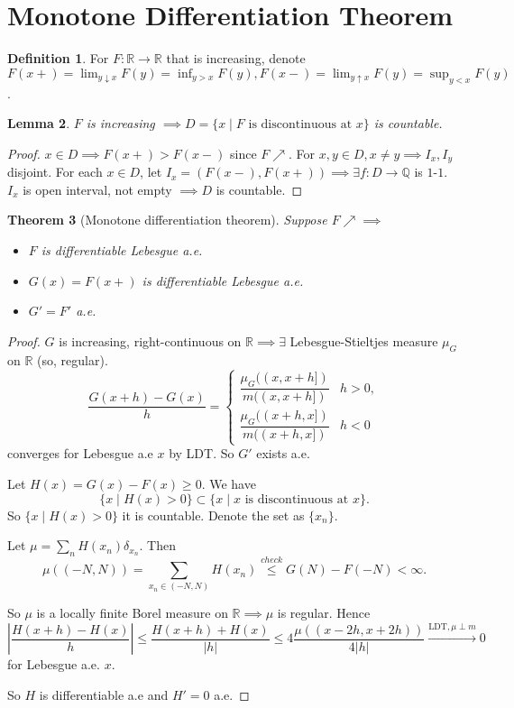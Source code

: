 \documentclass{report}
\newcommand{\R}{\mathbb{R}}
\newcommand{\Q}{\mathbb{Q}}
\newtheorem{theorem}{Theorem}[chapter]
\newtheorem{lemma}[theorem]{Lemma}
\theoremstyle{definition}
\newtheorem{definition}[theorem]{Definition}
\theoremstyle{remark}
\begin{document}
\section{Monotone Differentiation Theorem}
\cite[3.5]{follandRealAnalysisModern1999}
\begin{definition}
	For $F: \R \to \R$ that is increasing, denote $F(x+) = \lim_{y \downarrow x}F(y) = \inf_{y > x} F(y), F(x-) = \lim_{y \uparrow x} F(y) = \sup_{y < x} F(y)$.
\end{definition}

\begin{lemma}
	$F$ is increasing $\implies D = \{x \mid F \text{ is discontinuous at } x\}$ is countable.
\end{lemma}
\begin{proof}
	$x \in D \implies F(x+) > F(x-)$ since $F \nearrow$. For $x, y \in D, x \neq y \implies I_x, I_y$ disjoint. For each $x \in D$, let $I_x = (F(x-), F(x+)) \implies \exists f: D \to \Q$ is $1$-$1$. $I_x$ is open interval, not empty $\implies D$ is countable. 
\end{proof}

\begin{theorem}[Monotone differentiation theorem]
	Suppose $F \nearrow \implies$ \begin{itemize}
		\item $F$ is differentiable Lebesgue a.e.
		\item $G(x) = F(x+)$ is differentiable Lebesgue a.e.
		\item $G' = F'$ a.e.
	\end{itemize}
\end{theorem}
\begin{proof}
	$G$ is increasing, right-continuous on $\R \implies \exists$ Lebesgue-Stieltjes measure $\mu_G$ on $\R$ (so, regular). 
	\[
		\frac{G(x + h) - G(x)}{h} = \begin{cases}
			\dfrac{\mu_G((x, x+h])}{m((x, x+h])} & h > 0, \\[1em]
			\dfrac{\mu_G((x+h, x])}{m((x+h, x])} & h < 0
		\end{cases}	
	\] converges for Lebesgue a.e $x$ by LDT. So $G'$ exists a.e.

	Let $H(x) = G(x) - F(x) \geq 0$. We have \[\{x \mid H(x) > 0\} \subset \{x \mid x \text{ is discontinuous at } x\}.\]
	So $\{x \mid H(x) > 0\}$ it is countable. Denote the set as $\{x_n\}$.
	
	Let $\mu = \sum_{n} H(x_n) \delta_{x_n}$. Then \[\mu((-N, N)) = \sum_{x_n \in (-N, N)} H(x_n) \stackrel{check}{\leq} G(N) - F(-N) < \infty.\]

	So $\mu$ is a locally finite Borel measure on $\R \implies \mu$ is regular. Hence \[
		\left|\frac{H(x + h) - H(x)}{h}\right| \leq \frac{H(x + h) + H(x)}{|h|} \leq 4 \frac{\mu((x-2h, x+2h))}{4|h|} \xrightarrow[]{\text{LDT}, \mu \perp m} 0
	\] for Lebesgue a.e. $x$.

	So $H$ is differentiable a.e and $H' = 0$ a.e.
\end{proof}
\end{document}
